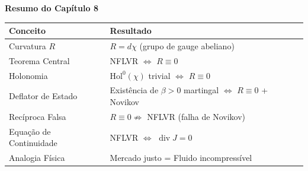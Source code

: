 \begin{center}
\textbf{Resumo do Cap\'itulo 8}

\vspace{0.5em}
\begin{tabular}{p{4cm} p{8cm}}
\toprule
\textbf{Conceito} & \textbf{Resultado} \\
\midrule
Curvatura $R$ & $R = d\chi$ (grupo de gauge abeliano) \\
Teorema Central & NFLVR $\Longleftrightarrow$ $R \equiv 0$ \\
Holonomia & $\mathrm{Hol}^0(\chi)$ trivial $\Longleftrightarrow$ $R \equiv 0$ \\
Deflator de Estado & Exist\^encia de $\beta > 0$ martingal $\Longleftrightarrow$ $R \equiv 0$ + Novikov \\
Rec\'iproca Falsa & $R \equiv 0 \not\Rightarrow$ NFLVR (falha de Novikov) \\
Equa\c{c}\~ao de Continuidade & NFLVR $\Longleftrightarrow$ $\operatorname{div} J = 0$ \\
Analogia F\'isica & Mercado justo = Fluido incompress\'ivel \\
\bottomrule
\end{tabular}
\end{center}


